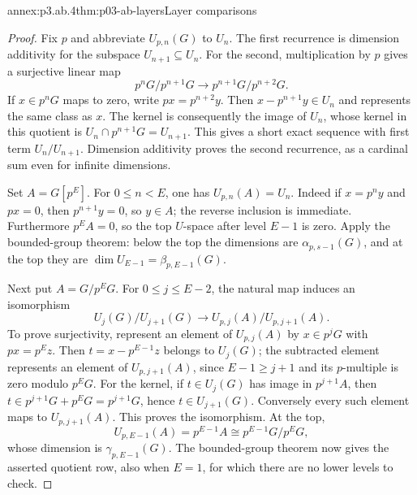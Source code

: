 \begin{annexitem}{annex:p3.ab.4}{thm:p03-ab-layers}{Layer comparisons}
\begin{proof}
Fix \(p\) and abbreviate \(U_{p,n}(G)\) to \(U_n\). The first recurrence
is dimension additivity for the subspace \(U_{n+1}\subseteq U_n\).
For the second, multiplication by \(p\) gives a surjective linear map
\[
 p^nG/p^{n+1}G\longrightarrow p^{n+1}G/p^{n+2}G.
\]
If \(x\in p^nG\) maps to zero, write \(px=p^{n+2}y\). Then
\(x-p^{n+1}y\in U_n\) and represents the same class as \(x\). The
kernel is consequently the image of \(U_n\), whose kernel in this
quotient is \(U_n\cap p^{n+1}G=U_{n+1}\). This gives a short exact
sequence with first term \(U_n/U_{n+1}\). Dimension additivity proves
the second recurrence, as a cardinal sum even for infinite dimensions.

Set \(A=G[p^E]\). For \(0\leq n<E\), one has
\(U_{p,n}(A)=U_n\). Indeed if \(x=p^ny\) and \(px=0\), then
\(p^{n+1}y=0\), so \(y\in A\); the reverse inclusion is immediate.
Furthermore \(p^EA=0\), so the top \(U\)-space after level \(E-1\)
is zero. Apply the bounded-group theorem: below the top the dimensions
are \(\alpha_{p,s-1}(G)\), and at the top they are
\(\dim U_{E-1}=\beta_{p,E-1}(G)\).

Next put \(A=G/p^EG\). For \(0\leq j\leq E-2\), the natural map induces
an isomorphism
\[
 U_j(G)/U_{j+1}(G)\longrightarrow U_{p,j}(A)/U_{p,j+1}(A).
\]
To prove surjectivity, represent an element of \(U_{p,j}(A)\) by
\(x\in p^jG\) with \(px=p^Ez\). Then
\(t=x-p^{E-1}z\) belongs to \(U_j(G)\); the subtracted element represents
an element of \(U_{p,j+1}(A)\), since \(E-1\geq j+1\) and its
\(p\)-multiple is zero modulo \(p^EG\). For the kernel, if
\(t\in U_j(G)\) has image in \(p^{j+1}A\), then
\(t\in p^{j+1}G+p^EG=p^{j+1}G\), hence \(t\in U_{j+1}(G)\).
Conversely every such element maps to \(U_{p,j+1}(A)\). This proves
the isomorphism. At the top,
\[
 U_{p,E-1}(A)=p^{E-1}A
             \cong p^{E-1}G/p^EG,
\]
whose dimension is \(\gamma_{p,E-1}(G)\). The bounded-group theorem
now gives the asserted quotient row, also when \(E=1\), for which
there are no lower levels to check.
\end{proof}
\end{annexitem}

